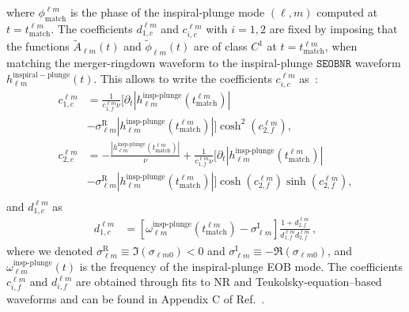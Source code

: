 \documentclass[twocolumn,prd,superscriptaddress,amsfonts,amssymb,amsmath,preprintnumbers]{revtex4-1}
\newcommand{\SEOB}{\texttt{SEOBNR}}
\begin{document}
%
where $ \phi_{\textrm{match}}^{\ell m}$ is the phase of the inspiral-plunge mode $(\ell, m)$ computed at $t = t_{\textrm{match}}^{\ell m}$. The coefficients $d_{1,c}^{\ell m}$ and $c_{i,c}^{\ell m}$ with $i = 1,2$
are fixed by imposing that the functions $\tilde{A}_{\ell m}(t)$ and $\tilde{\phi}_{\ell m}(t)$ are of class $C^1$ at $t = t_{\textrm{match}}^{\ell m}$, when matching the merger-ringdown waveform to the inspiral-plunge $\SEOB$ waveform $h_{\ell m}^\mathrm{inspiral-plunge}(t)$. This allows to write the coefficients $c_{i,c}^{\ell m}$ as~\cite{Cotesta:2018fcv}:
\begin{align} 
c_{1,c}^{\ell m} &= \frac{1}{c_{1,f}^{\ell
    m} \nu} \big[ \partial_t|h_{\ell
    m}^{\textrm{insp-plunge}}(t_{\textrm{match}}^{\ell m})| \nonumber \\
    &- \sigma^\textrm{R}_{\ell m} |h_{\ell
    m}^{\textrm{insp-plunge}}(t_{\textrm{match}}^{\ell
    m})|\big] \cosh^2{(c_{2,f}^{\ell m})}, \\
c_{2,c}^{\ell m} &= -\frac{ |h_{\ell
    m}^{\textrm{insp-plunge}}(t_{\textrm{match}}^{\ell
    m})|}{\nu} + \frac{1}{c_{1,f}^{\ell
    m} \nu} \big[ \partial_t|h_{\ell
    m}^{\textrm{insp-plunge}}(t_{\textrm{match}}^{\ell m})|  \nonumber \\
    &- \sigma^\textrm{R}_{\ell m} |h_{\ell
    m}^{\textrm{insp-plunge}}(t_{\textrm{match}}^{\ell
    m})|\big] \cosh{(c_{2,f}^{\ell m})}\sinh{(c_{2,f}^{\ell m})}, \\ \nonumber   
\end{align}
and $d_{1,c}^{\ell m}$ as
\begin{align}    
d_{1,c}^{\ell m} &= \left[\omega_{\ell m}^{\textrm{insp-plunge}}(t_{\textrm{match}}^{\ell m}) -  \sigma^\textrm{I}_{\ell
      m}\right]\frac{1+ d_{2,f}^{\ell m}}{d_{1,f}^{\ell m}d_{2,f}^{\ell m}}\,,
\end{align}
%
where we denoted $\sigma_{\ell m}^\textrm{R} \equiv \Im (\sigma_{\ell m0}) < 0$ and  $\sigma_{\ell m}^\textrm{I} \equiv -\Re (\sigma_{\ell m0})$, and $\omega_{\ell m}^{\textrm{insp-plunge}}(t)$ is the frequency of the inspiral-plunge EOB mode. The coefficients $c_{i,f}^{\ell m}$ and $d_{i,f}^{\ell m}$ are obtained through fits to NR and 
Teukolsky-equation--based waveforms and can be found in Appendix C of Ref.~\cite{Cotesta:2018fcv}.
\end{document}

